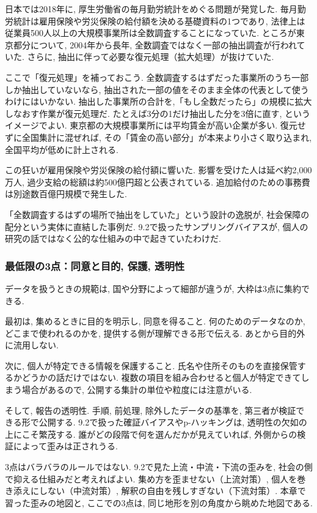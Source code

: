 日本では2018年に, 厚生労働省の毎月勤労統計をめぐる問題が発覚した.
毎月勤労統計は雇用保険や労災保険の給付額を決める基礎資料の1つであり, 法律上は従業員500人以上の大規模事業所は全数調査することになっていた.
ところが東京都分について, 2004年から長年, 全数調査ではなく一部の抽出調査が行われていた.
さらに, 抽出に伴って必要な復元処理（拡大処理）が抜けていた.

ここで「復元処理」を補っておこう.
全数調査するはずだった事業所のうち一部しか抽出していないなら, 抽出された一部の値をそのまま全体の代表として使うわけにはいかない.
抽出した事業所の合計を,「もし全数だったら」の規模に拡大しなおす作業が復元処理だ.
たとえば3分の1だけ抽出した分を3倍に直す, というイメージでよい.
東京都の大規模事業所には平均賃金が高い企業が多い. 復元せずに全国集計に混ぜれば, その「賃金の高い部分」が本来より小さく取り込まれ, 全国平均が低めに計上される.

この狂いが雇用保険や労災保険の給付額に響いた.
影響を受けた人は延べ約2{,}000万人, 過少支給の総額は約500億円超と公表されている.
追加給付のための事務費は別途数百億円規模で発生した.

「全数調査するはずの場所で抽出をしていた」という設計の逸脱が, 社会保障の配分という実体に直結した事例だ.
9.2で扱ったサンプリングバイアスが, 個人の研究の話ではなく公的な仕組みの中で起きていたわけだ.

\subsubsection*{最低限の3点：同意と目的, 保護, 透明性}

データを扱うときの規範は, 国や分野によって細部が違うが, 大枠は3点に集約できる.

最初は, 集めるときに目的を明示し, 同意を得ること.
何のためのデータなのか, どこまで使われるのかを, 提供する側が理解できる形で伝える.
あとから目的外に流用しない.

次に, 個人が特定できる情報を保護すること.
氏名や住所そのものを直接保管するかどうかの話だけではない.
複数の項目を組み合わせると個人が特定できてしまう場合があるので, 公開する集計の単位や粒度には注意がいる.

そして, 報告の透明性. 手順, 前処理, 除外したデータの基準を, 第三者が検証できる形で公開する.
9.2で扱った確証バイアスやp-ハッキングは, 透明性の欠如の上にこそ繁茂する.
誰がどの段階で何を選んだかが見えていれば, 外側からの検証によって歪みは正されうる.

3点はバラバラのルールではない.
9.2で見た上流・中流・下流の歪みを, 社会の側で抑える仕組みだと考えればよい.
集め方を歪ませない（上流対策）, 個人を巻き添えにしない（中流対策）, 解釈の自由を残しすぎない（下流対策）.
本章で習った歪みの地図と, ここでの3点は, 同じ地形を別の角度から眺めた地図である.

